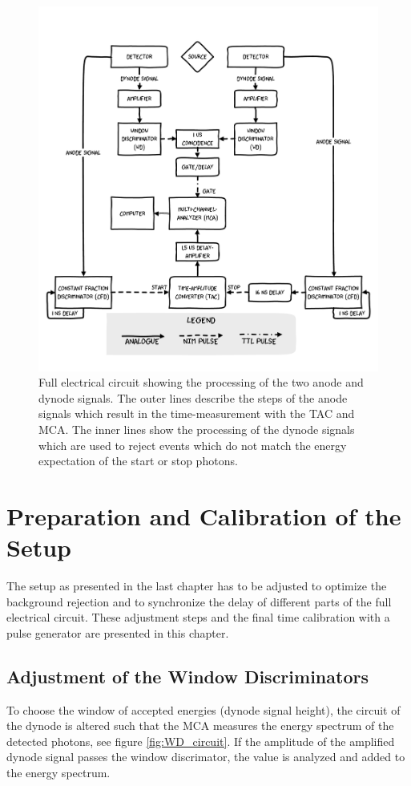 \documentclass[
	paper=A4,
	parskip=full,
	chapterprefix=true,
	11pt,
	headings=normal,
	bibliography=totoc,
	listof=totoc,
	titlepage=on,
]{scrreprt}
\begin{document}
\begin{figure}
	\centering
	\includegraphics{aufbau}
	\caption{Full electrical circuit showing the processing of the two anode and dynode signals. The outer lines describe the steps of the anode signals which result in the time-measurement with the TAC and MCA. The inner lines show the processing of the dynode signals which are used to reject events which do not match the energy expectation of the start or stop photons.}
	\label{fig:full_circuit}
\end{figure}


\chapter{Preparation and Calibration of the Setup}
The setup as presented in the last chapter has to be adjusted to optimize the background rejection and to synchronize the delay of different parts of the full electrical circuit. These adjustment steps and the final time calibration with a pulse generator are presented in this chapter.
\section{Adjustment of the Window Discriminators}
\label{ch_WD}
To choose the window of accepted energies (dynode signal height), the circuit of the dynode is altered such that the MCA measures the energy spectrum of the detected photons, see figure \ref{fig:WD_circuit}. If the amplitude of the amplified dynode signal passes the window discrimator, the value is analyzed and added to the energy spectrum. 
 
\end{document}
